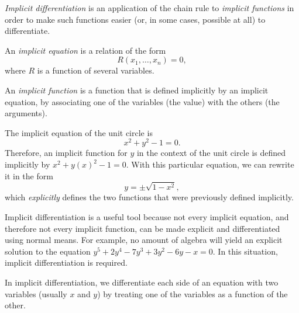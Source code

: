 \documentclass[headings=standardclasses]{scrreprt}
\begin{document}
\emph{Implicit differentiation} is an application of the chain rule to
\emph{implicit functions} in order to make such functions easier (or, in some
cases, possible at all) to differentiate.

\begin{definition}
  An \emph{implicit equation} is a relation of the form
  \[ R(x_{1}, \dots, x_{n}) = 0, \] where \(R\) is a function of several
  variables.

  An \emph{implicit function} is a function that is defined implicitly by an
  implicit equation, by associating one of the variables (the value) with the
  others (the arguments).
\end{definition}

\begin{example}
  The implicit equation of the unit circle is \[ x^{2} + y^{2} - 1 = 0. \]
  Therefore, an implicit function for \(y\) in the context of the unit circle is
  defined implicitly by \(x^{2} + {y(x)}^{2} - 1 = 0\). With this particular
  equation, we can rewrite it in the form \[ y = ±\sqrt{1 - x^{2}}, \] which
  \emph{explicitly} defines the two functions that were previously defined
  implicitly.
\end{example}

Implicit differentiation is a useful tool because not every implicit equation,
and therefore not every implicit function, can be made explicit and
differentiated using normal means. For example, no amount of algebra will yield
an explicit solution to the equation \(y^{5} + 2y^{4} - 7y^{3} + 3y^{2} - 6y - x
= 0\). In this situation, implicit differentiation is required.

In implicit differentiation, we differentiate each side of an equation with two
variables (usually \(x\) and \(y\)) by treating one of the variables as a
function of the other.
\end{document}
